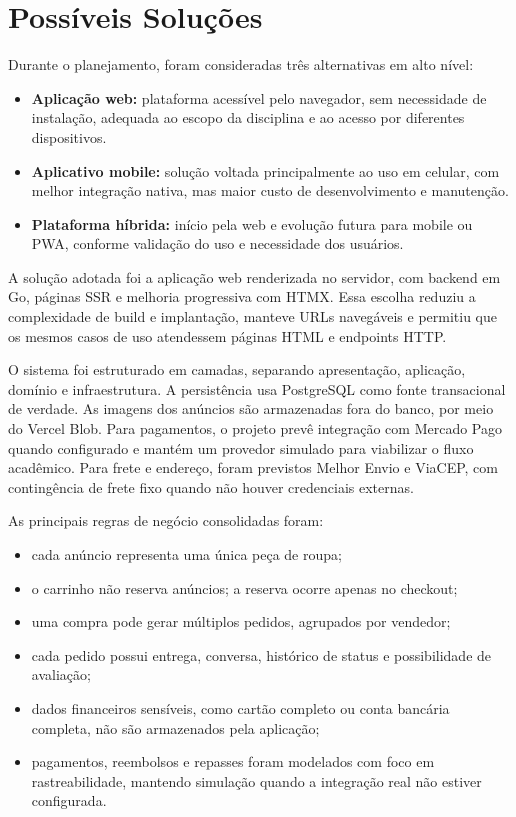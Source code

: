 ﻿\documentclass[12pt,a4paper]{article}
\begin{document}
\section{Possíveis Soluções}
Durante o planejamento, foram consideradas três alternativas em alto nível:

\begin{itemize}
    \item \textbf{Aplicação web:} plataforma acessível pelo navegador, sem necessidade de instalação, adequada ao escopo da disciplina e ao acesso por diferentes dispositivos.

    \item \textbf{Aplicativo mobile:} solução voltada principalmente ao uso em celular, com melhor integração nativa, mas maior custo de desenvolvimento e manutenção.

    \item \textbf{Plataforma híbrida:} início pela web e evolução futura para mobile ou PWA, conforme validação do uso e necessidade dos usuários.
\end{itemize}

A solução adotada foi a aplicação web renderizada no servidor, com backend em Go, páginas SSR e melhoria progressiva com HTMX. Essa escolha reduziu a complexidade de build e implantação, manteve URLs navegáveis e permitiu que os mesmos casos de uso atendessem páginas HTML e endpoints HTTP.

O sistema foi estruturado em camadas, separando apresentação, aplicação, domínio e infraestrutura. A persistência usa PostgreSQL como fonte transacional de verdade. As imagens dos anúncios são armazenadas fora do banco, por meio do Vercel Blob. Para pagamentos, o projeto prevê integração com Mercado Pago quando configurado e mantém um provedor simulado para viabilizar o fluxo acadêmico. Para frete e endereço, foram previstos Melhor Envio e ViaCEP, com contingência de frete fixo quando não houver credenciais externas.

As principais regras de negócio consolidadas foram:

\begin{itemize}
    \item cada anúncio representa uma única peça de roupa;
    \item o carrinho não reserva anúncios; a reserva ocorre apenas no checkout;
    \item uma compra pode gerar múltiplos pedidos, agrupados por vendedor;
    \item cada pedido possui entrega, conversa, histórico de status e possibilidade de avaliação;
    \item dados financeiros sensíveis, como cartão completo ou conta bancária completa, não são armazenados pela aplicação;
    \item pagamentos, reembolsos e repasses foram modelados com foco em rastreabilidade, mantendo simulação quando a integração real não estiver configurada.
\end{itemize}
\end{document}
